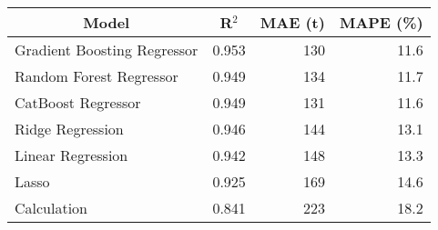 
\begin{tabular}[t]{lrrr}
\toprule
\multicolumn{1}{c}{Model} & \multicolumn{1}{c}{R$^2$} & \multicolumn{1}{c}{MAE (t)} & \multicolumn{1}{c}{MAPE (\%)}\\
\midrule
Gradient Boosting Regressor & 0.953 & 130 & 11.6\\
Random Forest Regressor & 0.949 & 134 & 11.7\\
CatBoost Regressor & 0.949 & 131 & 11.6\\
Ridge Regression & 0.946 & 144 & 13.1\\
Linear Regression & 0.942 & 148 & 13.3\\
Lasso & 0.925 & 169 & 14.6\\
Calculation & 0.841 & 223 & 18.2\\
\bottomrule
\end{tabular}
